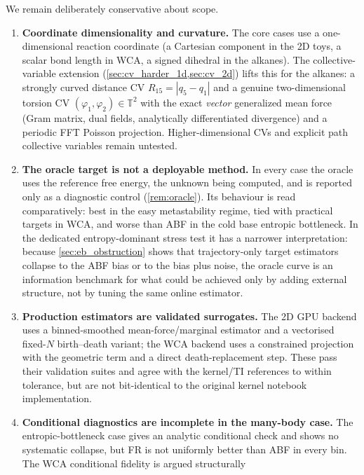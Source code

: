 We remain deliberately conservative about scope.
\begin{enumerate}
  \item \textbf{Coordinate dimensionality and curvature.} The core cases use a
        one-dimensional reaction coordinate (a Cartesian component in the 2D toys, a
        scalar bond length in WCA, a signed dihedral in the alkanes). The
        collective-variable extension (\cref{sec:cv_harder_1d,sec:cv_2d}) lifts this for
        the alkanes: a strongly curved distance CV $R_{15}=|q_5-q_1|$ and a genuine
        two-dimensional torsion CV $(\varphi_1,\varphi_2)\in\mathbb{T}^2$ with the exact
        \emph{vector} generalized mean force (Gram matrix, dual fields, analytically
        differentiated divergence) and a periodic FFT Poisson projection. Higher-dimensional
        CVs and explicit path collective variables remain untested.
  \item \textbf{The oracle target is not a deployable method.} In every
        case the oracle uses the reference free energy, the unknown being
        computed, and is reported only as a diagnostic control (\cref{rem:oracle}).
        Its behaviour is read comparatively: best in the easy metastability
        regime, tied with practical targets in WCA, and worse than ABF in the cold
        base entropic bottleneck. In the dedicated entropy-dominant stress test it
        has a narrower interpretation: because \cref{sec:eb_obstruction} shows that
        trajectory-only target estimators collapse to the ABF bias or to the bias
        plus noise, the oracle curve is an information benchmark for what could be
        achieved only by adding external structure, not by tuning the same online
        estimator.
  \item \textbf{Production estimators are validated surrogates.} The 2D GPU
        backend uses a binned-smoothed mean-force/marginal estimator and a
        vectorised fixed-$N$ birth--death variant; the WCA backend uses a
        constrained projection with the geometric term and a direct
        death-replacement step. These pass their validation suites and agree with
        the kernel/TI references to within tolerance, but are not bit-identical to
        the original kernel notebook implementation.
  \item \textbf{Conditional diagnostics are incomplete in the many-body case.}
        The entropic-bottleneck case gives an analytic conditional check and shows
        no systematic collapse, but FR is not uniformly better than ABF in every
        bin. The WCA conditional fidelity is argued structurally

\end{enumerate}

